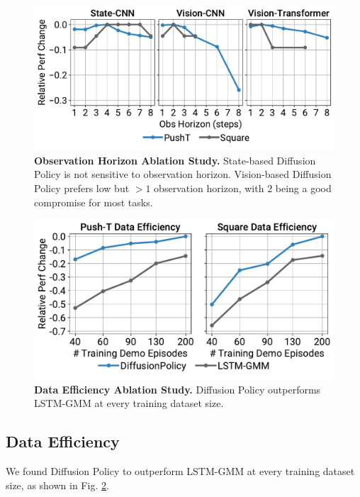 \documentclass[Afour,sageh,times]{sagej}
\begin{document}
\begin{figure}
\centering
\includegraphics[width=\linewidth]{figure/obs_horizon_figure.pdf}

\vspace{-2mm}
\caption{
\textbf{Observation Horizon Ablation Study.}
\label{fig:obs_horizon_ablation}
State-based Diffusion Policy is not sensitive to observation horizon.
Vision-based Diffusion Policy prefers low but $>1$ observation horizon, with $2$ being a good compromise for most tasks.
}
\vspace{-3mm}
\end{figure}

\begin{figure}
\centering
\includegraphics[width=\linewidth]{figure/sample_efficiency_figure.pdf}

\vspace{-2mm}
\caption{
\textbf{Data Efficiency Ablation Study.}
\label{fig:data_efficiency}
Diffusion Policy outperforms LSTM-GMM \cite{robomimic} at every training dataset size.
}
\vspace{-5mm}
\end{figure}

\subsection{Data Efficiency}
We found Diffusion Policy to outperform LSTM-GMM \cite{robomimic} at every training dataset size, as shown in Fig. \ref{fig:data_efficiency}.
\end{document}
